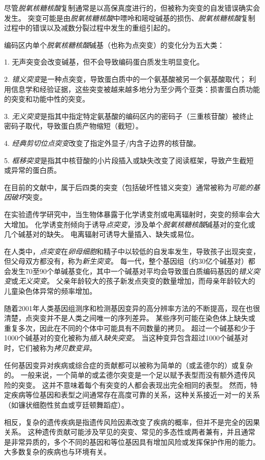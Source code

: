 \begin{proposition}[突变：遗传多样性的起源] \label{box:2_1}
	
	\quad \quad 尽管\textit{脱氧核糖核酸}复制通常是以高保真度进行的，但被称为突变的自发错误确实会发生。
	突变可能是由\textit{脱氧核糖核酸}中嘌呤和嘧啶碱基的损伤、\textit{脱氧核糖核酸}复制过程中的错误以及减数分裂过程中发生的重组引起的。
	
	
	\quad \quad 编码区内单个\textit{脱氧核糖核酸}碱基（也称为点突变）的变化分为五大类：
	
	
	1. 无声突变会改变碱基，但不会导致编码蛋白质发生明显变化。
	
	
	2. \textit{错义突变}是一种点突变，导致蛋白质中的一个氨基酸被另一个氨基酸取代；
	利用信息学和经验证据，这些突变被越来越多地分为至少两个亚类：损害蛋白质功能的突变和功能中性的突变。
	
	
	3. \textit{无义突变}是指其中指定特定氨基酸的编码区内的密码子（三重核苷酸）被终止密码子取代，导致蛋白质产物缩短（截短）。
	
	
	4. \textit{经典剪切位点突变}改变了指定外显子/内含子边界的核苷酸。
	
	5. \textit{框移突变}是指其中核苷酸的小片段插入或缺失改变了阅读框架，导致产生截短或异常的蛋白质。
	
	\quad \quad 在目前的文献中，属于后四类的突变（包括破坏性错义突变）通常被称为\textit{可能的基因破坏}突变。
	
	\quad \quad 在实验遗传学研究中，当生物体暴露于化学诱变剂或电离辐射时，突变的频率会大大增加。
	化学诱变剂倾向于诱导\textit{点突变}，涉及单个\textit{脱氧核糖核酸}碱基对的变化或几个碱基对的缺失。
	电离辐射可诱导大量插入、缺失或易位。
	
	\quad \quad 在人类中，\textit{点突变}在\textit{卵母细胞}和精子中以较低的自发率发生，导致孩子出现突变，但父母双方都没有，称为\textit{新生突变}。
	每一代，整个基因组（约30亿个碱基对）都会发生70至90个单碱基变化，其中一个碱基对平均会导致蛋白质编码基因的\textit{错义突变}或\textit{无义突变}。
	父亲年龄较大的孩子新发点突变的数量增加，而母亲年龄较大的儿童染色体异常的频率增加。
	
	
	\quad \quad 随着2001年人类基因组测序和检测基因变异的高分辨率方法的不断提高，现在也很清楚，点突变并不是人类之间唯一的序列差异。
	某些序列可能在染色体上缺失或重复多次，因此在不同的个体中可能具有不同数量的拷贝。
	超过一个碱基和少于1000个碱基对的变化被称为\textit{插入缺失突变}。
	当这种变异包含超过1000个碱基对时，它们被称为\textit{拷贝数变异}。
	
	
	\quad \quad 任何基因变异对疾病或综合症的贡献都可以被称为简单的（或孟德尔的）或复杂的。
	一般来说，一个简单的或孟德尔突变是一个足以赋予表型而没有额外遗传风险的突变。
	这并不意味着每个有突变的人都会表现出完全相同的表型。
	然而，特定疾病等位基因和表型之间通常存在高度可靠的关系，这种关系接近一对一的关系（如镰状细胞性贫血或亨廷顿舞蹈症）。
	
	
	\quad \quad 相反，复杂的遗传疾病是指遗传风险因素改变了疾病的概率，但并不是完全的因果关系。
	这种遗传贡献可能涉及罕见的突变、常见的多态性或两者兼有，并且通常是非常异质的，多个不同的基因和等位基因具有增加风险或发挥保护作用的能力。
	大多数复杂的疾病也与环境有关。
	
		
\end{proposition}



